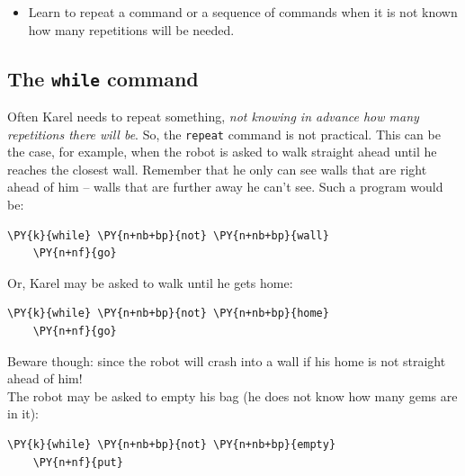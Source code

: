 \begin{itemize}
\item Learn to repeat a command or a sequence of commands when it is not known 
      how many repetitions will be needed.
\end{itemize}

\subsection{The {\tt while} command}

Often Karel needs to repeat something, {\em not knowing in advance how many repetitions
there will be}. So, the {\tt repeat} command is not practical. This can be the case, for example, 
when the robot is asked to walk straight ahead until he reaches the closest wall.
Remember that he only can see walls that are right ahead of him -- walls 
that are further away he can't see. Such a program would be:\\

\begin{bbox}
\begin{Verbatim}[commandchars=\\\{\}]
\PY{k}{while} \PY{n+nb+bp}{not} \PY{n+nb+bp}{wall}
    \PY{n+nf}{go}
\end{Verbatim}
\end{bbox}
\vspace{6mm}

\noindent
Or, Karel may be asked to walk until he gets home:\\

\begin{bbox}
\begin{Verbatim}[commandchars=\\\{\}]
\PY{k}{while} \PY{n+nb+bp}{not} \PY{n+nb+bp}{home}
    \PY{n+nf}{go}
\end{Verbatim}
\end{bbox}
\vspace{6mm}

\noindent
Beware though: {\color{red}{this program is dangerous}} since the robot will crash into a wall
if his home is not straight ahead of him!\\

\noindent
The robot may be asked to empty his bag (he does not know how many gems are in it):\\
 
\begin{bbox}
\begin{Verbatim}[commandchars=\\\{\}]
\PY{k}{while} \PY{n+nb+bp}{not} \PY{n+nb+bp}{empty}
    \PY{n+nf}{put}
\end{Verbatim}
\end{bbox}
\vspace{6mm}


